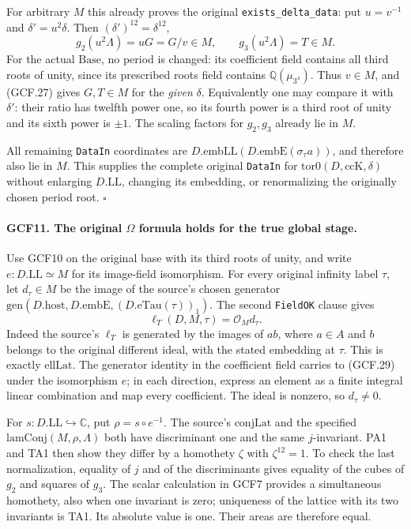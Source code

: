 \documentclass[11pt,a4paper]{article}
\numberwithin{equation}{section}
\theoremstyle{remark}\newtheorem{remark}[theorem]{Remark}
\begin{document}
For arbitrary \(M\) this already proves the original
\texttt{exists\_\allowbreak delta\_\allowbreak data}: put \(u=v^{-1}\) and
\(\delta'=u^2\delta\).  Then \((\delta')^{12}=\delta^{12}\),
\[
             g_2(u^2\Lambda)=uG=G/v\in M,\qquad
                         g_3(u^2\Lambda)=T\in M.       \tag{GCF.28}
\]
For the actual \(\mathrm{Base}\), no period is changed: its
coefficient field contains all third roots of unity, since its
prescribed roots field contains \(\mathbb Q(\mu_{3^4})\).
Thus \(v\in M\), and (GCF.27) gives \(G,T\in M\) for the
\emph{given} \(\delta\).  Equivalently one may compare it with
\(\delta'\): their ratio has twelfth power one, so its fourth
power is a third root of unity and its sixth power is \(\pm1\).
The scaling factors for \(g_2,g_3\) already lie in \(M\).

All remaining \texttt{Data\allowbreak In} coordinates are
\(D.\mathrm{embLL}(D.\mathrm{embE}(\sigma_\tau a))\), and
therefore also lie in \(M\).  This supplies the complete original
\texttt{Data\allowbreak In} for \(\mathrm{tor0}(D,\mathrm{ccK},\delta)\)
without enlarging \(D.\mathrm{LL}\), changing its embedding, or
renormalizing the originally chosen period root.
\hfill\(\square\)

\paragraph{GCF11. The original \(\Omega\) formula holds for the true global stage.}
\label{claim:GCF11}
Use GCF10 on the original base with its third roots of unity, and
write \(e:D.\mathrm{LL}\simeq M\) for its image-field isomorphism.
For every original infinity label \(\tau\), let \(d_\tau\in M\)
be the image of the source's chosen generator
\(\mathrm{gen}(D.\mathrm{host},D.\mathrm{embE},(D.\mathrm{eTau}(\tau))_1)\).
The second \texttt{Field\allowbreak OK} clause gives
\[
                 \ell_T(D,M,\tau)=\mathcal O_Md_\tau.
 \tag{GCF.29}
\]
Indeed the source's \(\ell_T\) is generated by the images of
\(a b\), where \(a\in A\) and \(b\) belongs to the original
different ideal, with the stated embedding at \(\tau\).
This is exactly \(\mathrm{ellLat}\).  The generator identity in
the coefficient field carries to (GCF.29) under the isomorphism
\(e\); in each direction, express an element as a finite integral
linear combination and map every coefficient.  The ideal is nonzero,
so \(d_\tau\ne0\).

For \(s:D.\mathrm{LL}\hookrightarrow\mathbb C\), put
\(\rho=s\circ e^{-1}\).  The source's \(\mathrm{conjLat}\)
and the specified \(\mathrm{lamConj}(M,\rho,\Lambda)\) both
have discriminant one and the same \(j\)-invariant.  PA1 and TA1
then show they differ by a homothety \(\zeta\) with
\(\zeta^{12}=1\).  To check the last normalization, equality of
\(j\) and of the discriminants gives equality of the cubes of
\(g_2\) and squares of \(g_3\).  The scalar calculation in GCF7
provides a simultaneous homothety, also when one invariant is zero;
uniqueness of the lattice with its two invariants is TA1.
Its absolute value is one.  Their areas are therefore equal.
\end{document}

